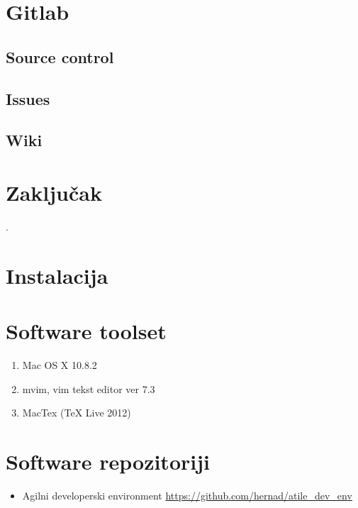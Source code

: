 \documentclass[times, utf8, seminar]{fit}
\begin{document}

\chapter {Gitlab}
\vspace*{-0.7cm}

\section{Source control}

\section{Issues}

\section{Wiki}

\chapter{Zaključak}

.




\appendix

\chapter{Instalacija}
\vspace*{-0.7cm}
\setlength{\parindent}{0cm}

\chapter{Software toolset}
\begin{enumerate}
  \item Mac OS X 10.8.2
  \item mvim, vim tekst editor ver 7.3
  \item MacTex (TeX Live 2012)
\end{enumerate}

\chapter{Software repozitoriji}

\begin{itemize}
  \item Agilni developerski environment  \url{https://github.com/hernad/atile\_dev\_env}

\end{itemize}
\end{document}
